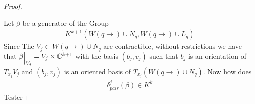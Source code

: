 \begin{proof}
\begin{center}
\end{center}


 Let $\beta$ be a generator of the Group 
 \begin{align*}
     K^{k+1}(W(q\to)\cup N_q,W(q\to)\cup L_q)
 \end{align*} Since The $V_j\subset W(q\to)\cup N_q$ are contractible, without restrictions we have that $\beta\einsch{V_j}=V_j\times \C^{k+1}$ with the basis $(b_j,v_j)$ such that $b_j$ is an orientation of $T_{x_j}V_j$ and $(b_j,v_j)$ is an oriented basis of $T_{x_j} (W(q\to)\cup N_q)$. Now how does 
 \begin{align*}
     \delta^j_{pair} (\beta)\in K^{k}
 \end{align*}
 Tester 
\end{proof}
